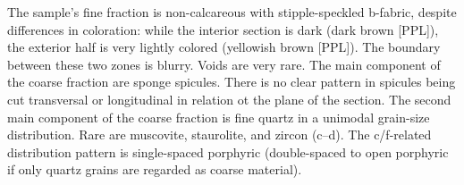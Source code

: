 \documentclass[a4paper]{article}
\begin{document}
\begin{multicols}{2}
\noindent The sample's fine fraction is non-calcareous with stipple-speckled b-fabric, despite differences in coloration: while the interior section is dark (dark brown [PPL]), the exterior half is very lightly colored (yellowish brown [PPL]). The boundary between these two zones is blurry. Voids are very rare. The main component of the coarse fraction are sponge spicules. There is no clear pattern in spicules being cut transversal or longitudinal in relation ot the plane of the section. The second main component of the coarse fraction is fine quartz in a unimodal grain-size distribution. Rare are muscovite, staurolite, and zircon (c--d). The c/f-related distribution pattern is single-spaced porphyric (double-spaced to open porphyric if only quartz grains are regarded as coarse material).
\end{multicols}
\end{document}
